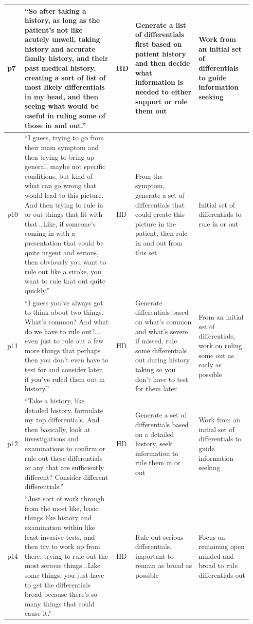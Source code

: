 \documentclass[a4paper, nobind]{templates/ociamthesis}
\begin{document}
\begin{longtable}[t]{>{\raggedright\arraybackslash}p{5em}|>{\raggedright\arraybackslash}p{14em}|>{\raggedright\arraybackslash}p{3em}|>{\raggedright\arraybackslash}p{6em}|>{\raggedright\arraybackslash}p{6em}}
\hline
p7 & “So after taking a history, as long as the patient's not like acutely unwell, taking history and accurate family history, and their past medical history, creating a sort of list of most likely differentials in my head, and then seeing what would be useful in ruling some of those in and out.” & HD & Generate a list of differentials first based on patient history and then decide what information is needed to either support or rule them out & Work from an initial set of differentials to guide information seeking\\
\hline
p10 & “I guess, trying to go from their main symptom and then trying to bring up general, maybe not specific conditions, but kind of what can go wrong that would lead to this picture. And then trying to rule in or out things that fit with that...Like, if someone's coming in with a presentation that could be quite urgent and serious, then obviously you want to rule out like a stroke, you want to rule that out quite quickly.” & HD & From the symptom, generate a set of differentials that could create this picture in the patient, then rule in and out from this set & Initial set of differentials to rule in or out\\
\hline
p11 & “I guess you've always got to think about two things. What's common? And what do we have to rule out?... even just to rule out a few more things that perhaps then you don't even have to test for and consider later, if you've ruled them out in history.” & HD & Generate differentials based on what's common and what's severe if missed, rule some differentials out during history taking so you don't have to test for them later & From an initial set of differentials, work on ruling some out as early as possible\\
\hline
p12 & “Take a history, like detailed history, formulate my top differentials. And then basically, look at investigations and examinations to confirm or rule out these differentials or any that are sufficiently different? Consider different differentials.” & HD & Generate a set of differentials based on a detailed history, seek information to rule them in or out & Work from an initial set of differentials to guide information seeking\\
\hline
p14 & “Just sort of work through from the most like, basic things like history and examination within like least invasive tests, and then try to work up from there. trying to rule out the most serious things...Like some things, you just have to get the differentials broad because there's so many things that could cause it.” & HD & Rule out serious differentials, important to remain as broad as possible & Focus on remaining open minded and broad to rule differentials out\\

\end{longtable}
\end{document}
